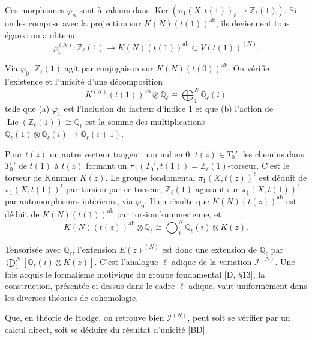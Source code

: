 \documentclass[12pt,a4paper]{article}
\theoremstyle{plain}
\theoremstyle{definition}
\theoremstyle{remark}
\DeclareMathOperator*{\Ker}{Ker}
\DeclareMathOperator{\Lie}{Lie}
\newcommand{\Q}{\mathbb{Q}}
\newcommand{\Z}{\mathbb{Z}}
\newcommand{\ab}{\text{ab}}
\begin{document}
Ces morphismes $\varphi_\alpha$ sont {\`a} valeurs dans $\Ker(\pi_1(X,t(1))_\ell\to\Z_\ell(1))$. Si on les compose avec la projection sur $K(N)(t(1))^{\ab}$, ils deviennent tous {\'e}gaux: on a obtenu
\begin{equation*}
\varphi_1^{(N)} : \Z_\ell(1) \longrightarrow K(N)(t(1))^{\ab} \subset V(t(1))^{(N)}.
\end{equation*}

Via $\varphi_0$, $\Z_\ell(1)$ agit par conjugaison sur $K(N)(t(0))^{\ab}$. On v{\'e}rifie l'existence et l'unicit{\'e} d'une d{\'e}composition
\begin{equation*}
K^{(N)}(t(1))^{\ab}\otimes\Q_\ell \cong \bigoplus_1^N \Q_\ell(i)
\end{equation*}
telle que (a) $\varphi_1$ est l'inclusion du facteur d'indice $1$ et que (b) l'action de $\Lie(\Z_\ell(1))\cong\Q_\ell$ est la somme des multiplications $\Q_\ell(1)\otimes\Q_\ell(i)\to\Q_\ell(i+1)$.

Pour $t(z)$ un autre vecteur tangent non nul en $0$: $t(z)\in T_0'$, les chemins dans $T_0'$ de $t(1)$ {\`a} $t(z)$ formant un $\pi_1(T_0',t(1))=\Z_\ell(1)$-torseur. C'est le torseur de Kummer $K(z)$. Le groupe fondamental $\pi_1(X,t(z))^\ell$ est d{\'e}duit de $\pi_1(X,t(1))^\ell$ par torsion par ce torseur, $\Z_\ell(1)$ agissant sur $\pi_1(X,t(1))^\ell$ par automorphismes int{\'e}rieurs, via $\varphi_0$. Il en r{\'e}sulte que $K(N)(t(z))^{\ab}$ est d{\'e}duit de $K(N)(t(1))^{\ab}$ par torsion kummerienne, et
\begin{equation*}
K(N)(t(z))^{\ab}\otimes\Q_\ell \cong \bigoplus_1^N \Q_\ell(i) \otimes K(z).
\end{equation*}

Tensoris{\'e}e avec $\Q_\ell$, l'extension $E(z)^{(N)}$ est donc une extension de $\Q_\ell$ par $\bigoplus_1^N[\Q_\ell(i)\otimes K(z)]$. C'est l'analogue $\ell$-adique de la variation $\mathcal{I}^{(N)}$. Une fois acquis le formalisme motivique du groupe fondamental [D, \S 13], la construction, pr{\'e}sent{\'e}e ci-dessus dans le cadre $\ell$-adique, vaut uniform{\'e}ment dans les diverses th{\'e}ories de cohomologie.

Que, en th{\'e}orie de Hodge, on retrouve bien $\mathcal{I}^{(N)}$, peut soit se v{\'e}rifier par un calcul direct, soit se d{\'e}duire du r{\'e}sultat d'unicit{\'e} [BD].

\subsection{}
\end{document}
